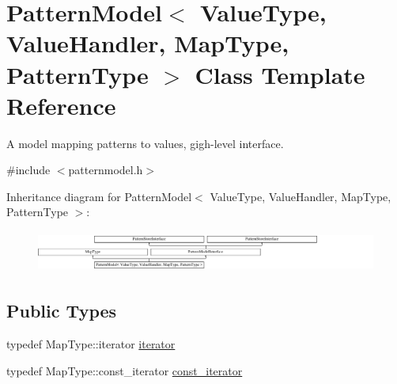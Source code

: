\hypertarget{classPatternModel}{}\section{Pattern\+Model$<$ Value\+Type, Value\+Handler, Map\+Type, Pattern\+Type $>$ Class Template Reference}
\label{classPatternModel}


A model mapping patterns to values, gigh-\/level interface.  




{\ttfamily \#include $<$patternmodel.\+h$>$}

Inheritance diagram for Pattern\+Model$<$ Value\+Type, Value\+Handler, Map\+Type, Pattern\+Type $>$\+:\begin{figure}[H]
\begin{center}
\leavevmode
\includegraphics[height=1.379310cm]{classPatternModel}
\end{center}
\end{figure}
\subsection*{Public Types}
\begin{DoxyCompactItemize}
\item 
typedef Map\+Type\+::iterator \hyperlink{classPatternModel_a9254a562bb22d604b6338c6b2fce76e5}{iterator}
\item 
typedef Map\+Type\+::const\+\_\+iterator \hyperlink{classPatternModel_a6809324b33b5ea832f0f15d25db0b46b}{const\+\_\+iterator}
\end{DoxyCompactItemize}
